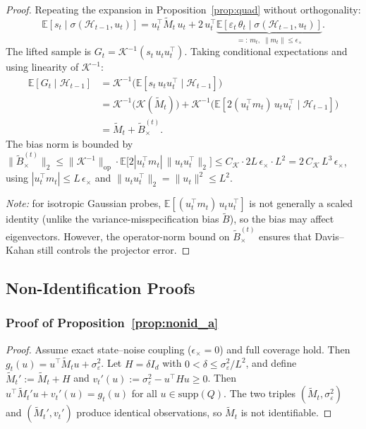 \documentclass{article}
\newcommand{\E}{\mathbb{E}}
\newcommand{\op}{\mathrm{op}}
\newcommand{\cH}{\mathcal{H}}
\newcommand{\supp}{\mathrm{supp}}
\begin{document}
  \begin{proof}
  Repeating the expansion in Proposition~\ref{prop:quad} without orthogonality:
  \[
  \E[s_t \mid \sigma(\cH_{t-1},u_t)]
  = u_t^\top \widetilde M_t\, u_t
  + 2\,u_t^\top \underbrace{\E[\varepsilon_t\,\theta_t \mid
  \sigma(\cH_{t-1},u_t)]}_{=:\,m_t,\;\|m_t\|\le\epsilon_\times}.
  \]
  The lifted sample is $G_t = \mathcal K^{-1}(s_t\,u_tu_t^\top)$.
  Taking conditional expectations and using linearity of $\mathcal K^{-1}$:
  \begin{align*}
  \E[G_t \mid \cH_{t-1}]
  &= \mathcal K^{-1}\!\bigl(\E[s_t\,u_tu_t^\top \mid \cH_{t-1}]\bigr) \\
  &= \mathcal K^{-1}\!\bigl(\mathcal K(\widetilde M_t)\bigr)
    + \mathcal K^{-1}\!\bigl(\E[2(u_t^\top m_t)\,u_tu_t^\top \mid \cH_{t-1}]\bigr) \\
  &= \widetilde M_t + \widetilde B_\times^{(t)}.
  \end{align*}
  The bias norm is bounded by
  $\|\widetilde B_\times^{(t)}\|_2
  \le \|\mathcal K^{-1}\|_{\op}\cdot\E\bigl[2|u_t^\top m_t|\,\|u_tu_t^\top\|_2\bigr]
  \le C_{\mathcal K}\cdot 2L\,\epsilon_\times\cdot L^2
  = 2\,C_{\mathcal K}\,L^3\,\epsilon_\times$,
  using $|u_t^\top m_t|\le L\,\epsilon_\times$ and $\|u_tu_t^\top\|_2 = \|u_t\|^2 \le L^2$.

  \emph{Note:} for isotropic Gaussian probes, $\E[(u_t^\top m_t)\,u_tu_t^\top]$
  is not generally a scaled identity (unlike the variance-misspecification bias
  $\widetilde B$), so the bias may affect eigenvectors.  However, the operator-norm
  bound on $\widetilde B_\times^{(t)}$ ensures that Davis--Kahan still controls
  the projector error.
  \end{proof}
\subsection{Non-Identification Proofs}

\subsubsection{Proof of Proposition~\ref{prop:nonid_a}}
\label{proof:nonid_a}

\begin{proof}
Assume exact state--noise coupling ($\epsilon_\times = 0$) and full coverage hold. Then $g_t(u) = u^\top \widetilde{M}_t u + \sigma_\varepsilon^2$.
Let $H = \delta I_d$ with $0 < \delta \le \sigma_\varepsilon^2/L^2$, and define $\widetilde{M}_t' := \widetilde{M}_t + H$ and $v_t'(u) := \sigma_\varepsilon^2 - u^\top H u \ge 0$.
Then $u^\top \widetilde{M}_t' u + v_t'(u) = g_t(u)$ for all $u \in \supp(Q)$.
The two triples $(\widetilde{M}_t, \sigma_\varepsilon^2)$ and $(\widetilde{M}_t', v_t')$ produce identical observations, so $\widetilde{M}_t$ is not identifiable.
\end{proof}
\end{document}

